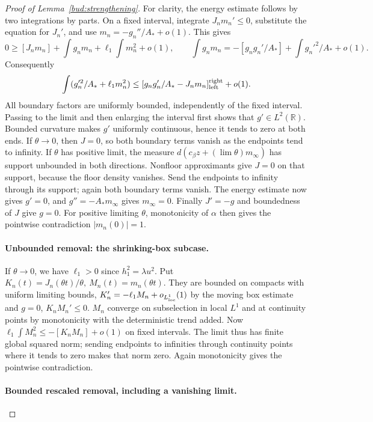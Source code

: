 \begin{proof}[Proof of Lemma~\ref{bud:strengthening}]
For clarity, the energy estimate follows by two integrations by parts.
On a fixed interval, integrate \(J_nm_n'\le0\), substitute the
equation for \(J_n'\), and use
\(m_n=-g_n''/A_*+o(1)\). This gives
\[
 0\ge[J_nm_n]+\int g_nm_n+\ell_1\int m_n^2+o(1),
 \qquad
 \int g_nm_n
 =-[g_ng_n'/A_*]+\int g_n'^2/A_*+o(1).
\]
Consequently
\[
 \int (g_n'^2/A_*+\ell_1m_n^2)\le [g_n g_n'/A_* -J_n m_n]_{\rm left}^{\rm right}+o(1).
\]
All boundary factors are uniformly bounded, independently of the fixed
interval. Passing to the limit and then enlarging the interval first
shows that \(g'\in L^2(\mathbb R)\). Bounded curvature makes
\(g'\) uniformly continuous, hence it tends to zero at both ends.
If \(\theta\to0\), then \(J=0\), so both boundary terms vanish
as the endpoints tend to infinity. If \(\theta\) has positive
limit, the measure
\(d(c_\beta z+(\lim\theta)m_\infty)\) has support unbounded in
both directions. Nonfloor approximants give \(J=0\) on that support,
because the floor density vanishes. Send the endpoints to infinity
through its support; again both boundary terms vanish. The energy
estimate now gives \(g'=0\), and \(g''=-A_*m_\infty\) gives
\(m_\infty=0\). Finally \(J'=-g\) and boundedness of \(J\)
give \(g=0\). For positive limiting \(\theta\), monotonicity of
\(\alpha\) then gives the pointwise contradiction
\(|m_n(0)|=1\).


\paragraph{Unbounded removal: the shrinking-box subcase.}

If \(\theta\to0\), we have \(\ell_1>0\) since \(h_1^2=\lambda u^2\). Put \(K_n(t)=J_n(\theta t)/\theta,\ M_n(t)=m_n(\theta t)\). They are bounded on compacts with uniform limiting bounds, \(K_n'=-\ell_1 M_n+o_{L^1_{\rm loc}}(1)\) by the moving box estimate and \(g=0\), \(K_n M_n'\le0\). \(M_n\) converge on subselection in local \(L^1\) and at continuity points by monotonicity with the deterministic trend added. Now \(\ell_1\int M_n^2\le-[K_n M_n]+o(1)\) on fixed intervals. The limit thus has finite global squared norm; sending endpoints to infinities through continuity points where it tends to zero makes that norm zero. Again monotonicity gives the pointwise contradiction.


\paragraph{Bounded rescaled removal, including a vanishing limit.}


\end{proof}
